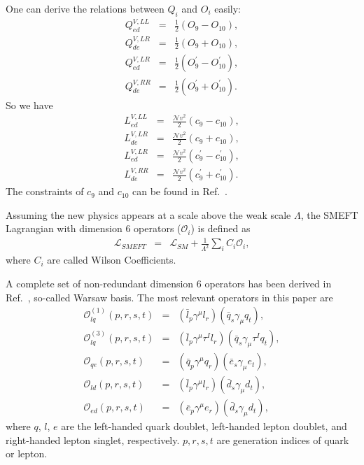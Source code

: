 \documentclass[a4paper,11pt]{article}
\begin{document}
One can derive the relations between $Q_i$ and $O_i$ easily:
\begin{eqnarray}
  Q^{V,LL}_{ed} &=& \frac{1}{2}\left(O_9-O_{10}\right),  \\
  Q^{V,LR}_{de} &=& \frac{1}{2}\left(O_9+O_{10}\right),  \\
  Q^{V,LR}_{ed} &=& \frac{1}{2}\left(O^{\prime}_9-O^{\prime}_{10}\right),  \\
  Q^{V,RR}_{de} &=& \frac{1}{2}\left(O^{\prime}_9+O^{\prime}_{10}\right).   
\end{eqnarray}
So we have 
\begin{eqnarray}
  L^{V,LL}_{ed} &=& \frac{\mathcal{N}v^2}{2}(c_9-c_{10}),  \\
  L^{V,LR}_{de} &=& \frac{\mathcal{N}v^2}{2}(c_9+c_{10}),  \\
  L^{V,LR}_{ed} &=& \frac{\mathcal{N}v^2}{2}(c^{\prime}_9-c^{\prime}_{10}),  \\
  L^{V,RR}_{de} &=& \frac{\mathcal{N}v^2}{2}(c^{\prime}_9+c^{\prime}_{10}). 
\end{eqnarray}
The constraints of $c_9$ and $c_{10}$ can be found in Ref.~\cite{Altmannshofer:2021qrr}.

Assuming the new physics appears at a scale above the weak scale $\Lambda$, 
the SMEFT Lagrangian with dimension 6 operators ($\mathcal{O}_i$) is defined as
\begin{eqnarray}
  \mathcal{L}_{SMEFT} &=& \mathcal{L}_{SM} + \frac{1}{\Lambda^2}\sum_{i}C_i\mathcal{O}_i,  
\end{eqnarray}
where $C_i$ are called Wilson Coefficients.

A complete set of non-redundant dimension 6 operators has been derived in Ref.~\cite{Grzadkowski:2010es}, so-called Warsaw basis. 
The most relevant operators in this paper are
\begin{eqnarray}
   \mathcal{O}^{(1)}_{lq}(p,r,s,t) &=& (\bar{l}_p\gamma^\mu l_r)(\bar{q}_s\gamma_\mu q_{t}),  \label{O1lq} \\ 
   \mathcal{O}^{(3)}_{lq}(p,r,s,t) &=& (\bar{l}_p\gamma^\mu\tau^I l_r)(\bar{q}_s\gamma_\mu\tau^I q_{t}),  \label{O3lq} \\ 
   \mathcal{O}_{qe}(p,r,s,t) &=& (\bar{q}_p\gamma^\mu q_r)(\bar{e}_s\gamma_\mu e_t), \label{Oqe} \\
   \mathcal{O}_{ld}(p,r,s,t) &=& (\bar{l}_p\gamma^\mu l_r)(\bar{d}_s\gamma_\mu d_t), \label{Old} \\
   \mathcal{O}_{ed}(p,r,s,t) &=& (\bar{e}_p\gamma^\mu e_r)(\bar{d}_s\gamma_\mu d_t), \label{Oed} 
\end{eqnarray}
where $q$, $l$, $e$ are the left-handed quark doublet, left-handed lepton doublet, and right-handed lepton singlet, respectively. 
$p,r,s,t$ are generation indices of quark or lepton.
\end{document}
